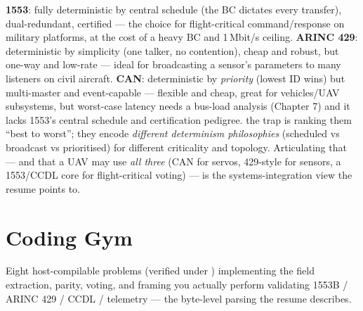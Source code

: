\textbf{1553}: fully deterministic by central schedule (the BC dictates every
transfer), dual-redundant, certified --- the choice for flight-critical
command/response on military platforms, at the cost of a heavy BC and 1\,Mbit/s
ceiling. \textbf{ARINC 429}: deterministic by simplicity (one talker, no
contention), cheap and robust, but one-way and low-rate --- ideal for
broadcasting a sensor's parameters to many listeners on civil aircraft.
\textbf{CAN}: deterministic by \emph{priority} (lowest ID wins) but multi-master
and event-capable --- flexible and cheap, great for vehicles/UAV subsystems, but
worst-case latency needs a bus-load analysis (Chapter 7) and it lacks 1553's
central schedule and certification pedigree. \trap the trap is ranking them
``best to worst''; they encode \emph{different determinism philosophies}
(scheduled vs broadcast vs prioritised) for different criticality and topology.
Articulating that --- and that a UAV may use \emph{all three} (CAN for servos,
429-style for sensors, a 1553/CCDL core for flight-critical voting) --- is the
systems-integration view the resume points to.

\section{Coding Gym}

\begin{partnote}
Eight host-compilable problems (verified under
) implementing the field extraction, parity,
voting, and framing you actually perform validating 1553B / ARINC 429 / CCDL /
telemetry --- the byte-level parsing the resume describes.
\end{partnote}

